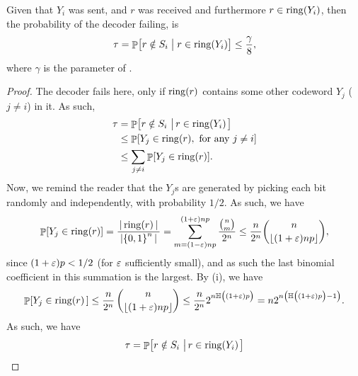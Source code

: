 \begin{lemma}
    Given that $Y_i$ was sent, and $r$ was received and furthermore
    $r \in \bring{Y_i}$, then the probability of the decoder failing,
    is
    \begin{equation*}
        \tau%
        =%
        \ProbCond{\bigl. r \notin S_i }{ r \in \bring{Y_i} }%
        \leq
        \frac{\gamma}{8},
    \end{equation*}
    where $\gamma$ is the parameter of .
\end{lemma}

\newcommand{\mBigA}{\rule[0.0cm]{0.0cm}{0.27cm}} %
\newcommand{\mBigB}{\rule[0.0cm]{0.0cm}{0.29cm}} %

\begin{proof}
    The decoder fails here, only if $\bring{r}$ contains some other
    codeword $Y_j$ ($j\ne i$) in it. As such,
    \begin{align*}
        \tau &= \Prob{ r \notin S_i \sep{ r \in \bring{Y_i} }} \\
        &\leq \Prob{ Y_j \in
           \bring{r}, \text{ for any } j\neq i} \\
        &\leq \sum_{j\ne i} \Prob{ Y_j
           \in \bring{r}}.
    \end{align*}
    Now, we remind the reader that the $Y_j$s are generated by picking
    each bit randomly and independently, with probability $1/2$. As
    such, we have
    \begin{equation*}
        \Prob{ Y_j \in \bring{r}}%
        =%
        \frac{\,\cardin{\,\sring{r} \,}\,}{\,\cardin{\MakeSBig \brc{0,1}^n \,}\,}
        =%
        \sum_{m=(1-\eps)np}^{(1+\eps)np}
        \frac{\binom{n}{m}}{2^n} \leq 
        \frac{n}{2^n} \binom{n}{\floor{(1+\eps)np}},
    \end{equation*}
    since $(1+{\varepsilon})p < 1/2$ (for ${\varepsilon}$ sufficiently small), and as
    such the last binomial coefficient in this summation is the
    largest. By  (i), we have
    \begin{equation*}
        \Prob{ Y_j \in \bring{r} \,}%
        \leq%
        \frac{n}{2^n} \, \binom{n}{\floor{(1+\eps)np}}%
        \leq %
        \frac{n}{2^n} 2^{n \EntropyX{ \mBigA (1+\eps)p }}%
        =%
        n 2^{n \pth{ \EntropyX{ \mBigA(1+\eps)p } -1 }}.
    \end{equation*}
    As such, we have
    \begin{align*}
      \tau%
      &=%
        \Prob{ r \notin S_i \sep{ r \in \bring{Y_i} }}\\

\end{align*}
\end{proof}
